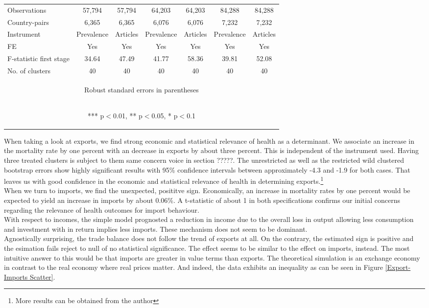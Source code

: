 \documentclass{article}
\begin{document}
\begin{table}[htbp]
{\begin{tabular}{lcccccc}
Observations & 57,794 & 57,794 & 64,203 & 64,203 & 84,288 & 84,288 \\
Country-pairs & 6,365 & 6,365 & 6,076 & 6,076 & 7,232 & 7,232 \\
Instrument & Prevalence & Articles & Prevalence & Articles & Prevalence & Articles \\
FE & Yes & Yes & Yes & Yes & Yes & Yes \\
F-statistic first stage & 34.64 & 47.49 & 41.77 & 58.36 & 39.81 & 52.08 \\
No. of clusters & 40 & 40 & 40 & 40 & 40 & 40 \\ \hline
\multicolumn{7}{c}{\begin{footnotesize} Robust standard errors in parentheses\end{footnotesize}} \\
\multicolumn{7}{c}{\begin{footnotesize} *** p$<$0.01, ** p$<$0.05, * p$<$0.1\end{footnotesize}} \\
\end{tabular}
}
\end{table}

When taking a look at exports, we find strong economic and statistical relevance of health as a determinant. We associate an increase in the mortality rate by one percent with an decrease in exports by about three percent. This is independent of the instrument used. Having three treated clusters is subject to them same concern voice in section ?????. The unrestricted as well as the restricted wild clustered bootstrap errors show highly significant results with 95\% confidence intervals between approximately -4.3 and -1.9 for both cases. That leaves us with good confidence in the economic and statistical relevance of health in determining exports.\footnote{More results can be obtained from the author}\\
When we turn to imports, we find the unexpected, posititve sign.  Economically, an increase in mortality rates by one percent would be expected to yield an increase in imports by about 0.06\%. A t-statistic of about 1 in both specifications confirms our initial concerns regarding the relevance of health outcomes for import behaviour. \\
With respect to incomes, the simple model prognosted a reduction in income due to the overall loss in output allowing less consumption and investment with in return implies less imports. These mechanism does not seem to be dominant. \\
Agnostically surprising, the trade balance does not follow the trend of exports at all. On the contrary, the estimated sign is positive and the esimation fails reject to null of no statistical significance. The effect seems to be similar to the effect on imports, instead. The most intuitive answer to this would be that imports are greater in value terms than exports. The theoretical simulation is an exchange economy in contrast to the real economy where real prices matter. And indeed, the data exhibits an inequality as can be seen in Figure \ref{Export-Imports Scatter}.
\end{document}
